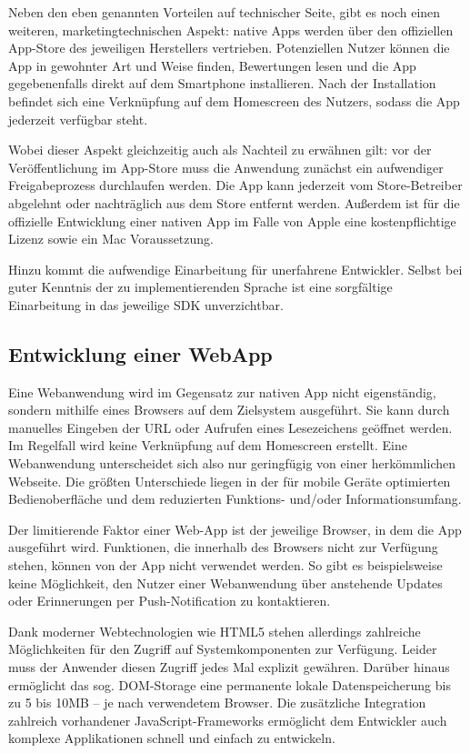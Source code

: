 Neben den eben genannten Vorteilen auf technischer Seite, gibt es noch einen weiteren, marketingtechnischen Aspekt: native Apps werden über den offiziellen App-Store des jeweiligen Herstellers vertrieben. Potenziellen Nutzer können die App in gewohnter Art und Weise finden, Bewertungen lesen und die App gegebenenfalls direkt auf dem Smartphone installieren. Nach der Installation befindet sich eine Verknüpfung auf dem Homescreen des Nutzers, sodass die App jederzeit verfügbar steht.

Wobei dieser Aspekt gleichzeitig auch als Nachteil zu erwähnen gilt: vor der Veröffentlichung im App-Store muss die Anwendung zunächst ein aufwendiger Freigabeprozess durchlaufen werden. Die App kann jederzeit vom Store-Betreiber abgelehnt oder nachträglich aus dem Store entfernt werden. Außerdem ist für die offizielle Entwicklung einer nativen App im Falle von Apple eine kostenpflichtige Lizenz sowie ein Mac Voraussetzung.

Hinzu kommt die aufwendige Einarbeitung für unerfahrene Entwickler. Selbst bei guter Kenntnis der zu implementierenden Sprache ist eine sorgfältige Einarbeitung in das jeweilige SDK unverzichtbar. 

\subsection{Entwicklung einer WebApp}
Eine Webanwendung wird im Gegensatz zur nativen App nicht eigenständig, sondern mithilfe eines Browsers auf dem Zielsystem ausgeführt. Sie kann durch manuelles Eingeben der URL oder Aufrufen eines Lesezeichens geöffnet werden. Im Regelfall wird keine Verknüpfung auf dem Homescreen erstellt. Eine Webanwendung unterscheidet sich also nur geringfügig von einer herkömmlichen Webseite. Die größten Unterschiede liegen in der für mobile Geräte optimierten Bedienoberfläche und dem reduzierten Funktions- und/oder Informationsumfang.

Der limitierende Faktor einer Web-App ist der jeweilige Browser, in dem die App ausgeführt wird. Funktionen, die innerhalb des Browsers nicht zur Verfügung stehen, können von der App nicht verwendet werden. So gibt es beispielsweise keine Möglichkeit, den Nutzer einer Webanwendung über anstehende Updates oder Erinnerungen per Push-Notification zu kontaktieren. 

Dank moderner Webtechnologien wie HTML5 stehen allerdings zahlreiche Möglichkeiten für den Zugriff auf Systemkomponenten zur Verfügung. Leider muss der Anwender diesen Zugriff jedes Mal explizit gewähren. Darüber hinaus ermöglicht das sog. DOM-Storage eine permanente lokale Datenspeicherung bis zu 5 bis 10MB – je nach verwendetem Browser. Die zusätzliche Integration zahlreich vorhandener JavaScript-Frameworks ermöglicht dem Entwickler auch komplexe Applikationen schnell und einfach zu entwickeln.

